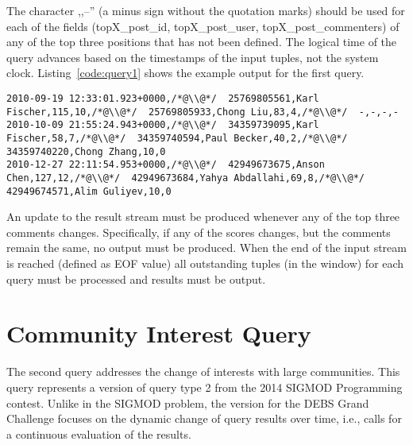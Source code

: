 \documentclass{sig-alternate}
\begin{document}
The character ,,--'' (a minus sign without the quotation marks) should be used for each of the fields (topX\_post\_id, topX\_post\_user, topX\_post\_commenters) of any of the top three positions that has not been defined. The logical time of the query advances based on the timestamps of the input tuples, not the system clock. Listing~\ref{code:query1} shows the example output for the first query.

\begin{lstlisting}[float=ht,caption={Output example for the three top scoring posts query},label={code:query1}]
2010-09-19 12:33:01.923+0000,/*@\\@*/  25769805561,Karl Fischer,115,10,/*@\\@*/  25769805933,Chong Liu,83,4,/*@\\@*/  -,-,-,-
2010-10-09 21:55:24.943+0000,/*@\\@*/  34359739095,Karl Fischer,58,7,/*@\\@*/  34359740594,Paul Becker,40,2,/*@\\@*/  34359740220,Chong Zhang,10,0
2010-12-27 22:11:54.953+0000,/*@\\@*/  42949673675,Anson Chen,127,12,/*@\\@*/  42949673684,Yahya Abdallahi,69,8,/*@\\@*/  42949674571,Alim Guliyev,10,0
\end{lstlisting}

An update to the result stream must be produced whenever any of the top three comments changes. Specifically, if any of the scores changes, but the comments remain the same, no output must be produced. When the end of the input stream is reached (defined as EOF value) all outstanding tuples (in the window) for each query must be processed and results must be output. 

\section{Community Interest Query}
\label{sec:query2}
The second query addresses the change of interests with large communities. This query represents a version of query type 2 from the 2014 SIGMOD Programming contest. Unlike in the SIGMOD problem, the version for the DEBS Grand Challenge focuses on the dynamic change of query results over time, i.e., calls for a continuous evaluation of the results. 
\end{document}
